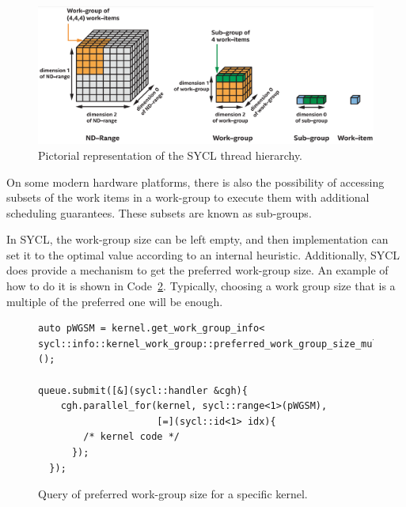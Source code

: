 \begin{figure}[ht!]
    \centering
    \includegraphics[width=\textwidth]{media/sycl_nd_range.png}
    \caption{Pictorial representation of the SYCL thread hierarchy.}
    \label{fig:sycl_nd_range}
\end{figure}

On some modern hardware platforms, there is also the possibility of accessing subsets of the work items in a
work-group to execute them with additional scheduling guarantees. These subsets are known as sub-groups. 

In SYCL, the work-group size can be left empty, and then implementation can set it to the optimal value according to an internal heuristic. Additionally, SYCL does provide a mechanism to get the preferred work-group size. An example of how to do it is shown in Code~\ref{code:work_group_size}. Typically, choosing a work group size that is a multiple of the preferred one will be enough.

\begin{figure}[ht!]
\renewcommand{\figurename}{Code}
\begin{verbatim}
auto pWGSM = kernel.get_work_group_info<
sycl::info::kernel_work_group::preferred_work_group_size_multiple>();

queue.submit([&](sycl::handler &cgh){
    cgh.parallel_for(kernel, sycl::range<1>(pWGSM), 
                     [=](sycl::id<1> idx){
        /* kernel code */
      });
  });
\end{verbatim}
\caption{Query of preferred work-group size for a specific kernel.}
\label{code:work_group_size}
\end{figure}

